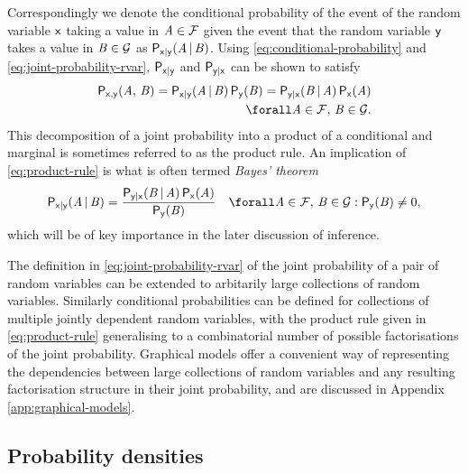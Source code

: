 Correspondingly we denote the conditional probability of the event of the random variable $\mathsf{x}$ taking a value in $\mathit{A} \in \mathcal{F}$ given the event that the random variable $\mathsf{y}$ takes a value in $\mathit{B} \in \mathcal{G}$ as $\mathsf{P}_{\mathsf{x}|\mathsf{y}}(\mathit{A}\operatorname{|}\mathit{B})$. Using \eqref{eq:conditional-probability} and \eqref{eq:joint-probability-rvar}, $\mathsf{P}_{\mathsf{x}|\mathsf{y}}$ and $\mathsf{P}_{\mathsf{y}|\mathsf{x}}$ can be shown to satisfy
\begin{equation}\label{eq:product-rule}
\begin{split}
  \prob{\rvar{x},\rvar{y}}(\set{A},\,\set{B}) =
  \prob{\rvar{x}|\rvar{y}}(\set{A} \gvn \set{B}) \, \prob{\rvar{y}}(\set{B}) =
  \prob{\rvar{y}|\rvar{x}}(\set{B} \gvn \set{A}) \, \prob{\rvar{x}}(\set{A})\\
  \forall \set{A} \in \sset{F},\,\set{B} \in \sset{G}.
\end{split}
\end{equation}
This decomposition of a joint probability into a product of a conditional and marginal is sometimes referred to as the product rule. An implication of \eqref{eq:product-rule} is what is often termed \emph{Bayes' theorem}
\begin{equation}\label{eq:bayes-theorem}
\begin{split}
  \prob{\rvar{x}|\rvar{y}}(\set{A} \gvn \set{B}) =
  \frac
    {\prob{\rvar{y}|\rvar{x}}(\set{B} \gvn \set{A}) \, \prob{\rvar{x}}(\set{A})}
    {\prob{\rvar{y}}(\set{B})} 
  \quad
  \forall \set{A} \in \sset{F},\,
  \set{B} \in \sset{G} : \prob{\rvar{y}}(\set{B}) \neq 0,
\end{split}
\end{equation}
which will be of key importance in the later discussion of inference.

The definition in \eqref{eq:joint-probability-rvar} of the joint probability of a pair of random variables can be extended to arbitarily large collections of random variables. Similarly conditional probabilities can be defined for collections of multiple jointly dependent random variables, with the product rule given in \eqref{eq:product-rule} generalising to a combinatorial number of possible factorisations of the joint probability. Graphical models offer a convenient way of representing the dependencies between large collections of random variables and any resulting factorisation structure in their joint probability, and are discussed in Appendix \ref{app:graphical-models}.

\subsection{Probability densities}\label{subsec:probability-densities}

